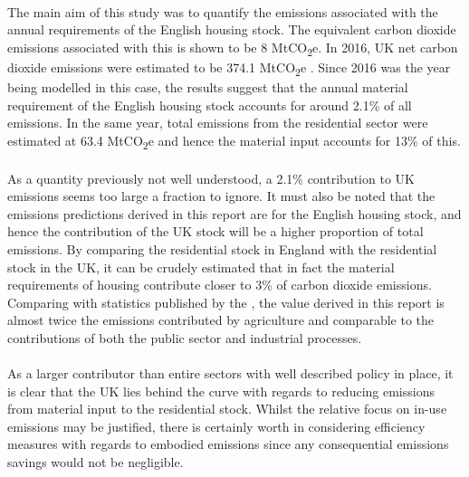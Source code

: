 \documentclass[12pt]{article}
\begin{document}
\paragraph{}
The main aim of this study was to quantify the emissions associated with the annual  requirements of the English housing stock. The equivalent carbon dioxide emissions associated with this is shown to be 8 MtCO\textsubscript{2}e. In 2016, UK net carbon dioxide emissions were estimated to be 374.1 MtCO\textsubscript{2}e \citep{Department_for_Business_Energy_and_Industrial_Strategy2017-oa}. Since 2016 was the year being modelled in this case, the results suggest that the annual material requirement of the English housing stock accounts for around 2.1\% of all emissions. In the same year, total emissions from the residential sector were estimated at 63.4 MtCO\textsubscript{2}e and hence the material input accounts for 13\% of this. 

\paragraph{}
As a quantity previously not well understood, a 2.1\% contribution to UK emissions seems too large a fraction to ignore. It must also be noted that the emissions predictions derived in this report are for the English housing stock, and hence the contribution of the UK stock will be a higher proportion of total emissions. By comparing the residential stock in England with the residential stock in the UK, it can be crudely estimated that in fact the material requirements of housing contribute closer to 3\% of carbon dioxide emissions. Comparing with statistics published by the \citet{Department_for_Business_Energy_and_Industrial_Strategy2017-oa}, the value derived in this report is almost twice the emissions contributed by agriculture and comparable to the contributions of both the public sector and industrial processes.

\paragraph{}
As a larger contributor than entire sectors with well described policy in place, it is clear that the UK lies behind the curve with regards to reducing emissions from material input to the residential stock. Whilst the relative focus on in-use emissions may be justified, there is certainly worth in considering efficiency measures with regards to embodied emissions since any consequential emissions savings would not be negligible.
\end{document}
